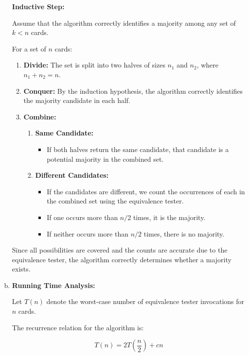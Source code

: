 \documentclass[10pt,letter,notitlepage]{article}
\begin{document}
\begin{Answer}
\begin{enumerate}[(a)]
    \textbf{Inductive Step:}

    Assume that the algorithm correctly identifies a majority among any set of $k < n$ cards.

    For a set of $n$ cards:

    \begin{enumerate}
        \item \textbf{Divide:} The set is split into two halves of sizes $n_1$ and $n_2$, where $n_1 + n_2 = n$.
        \item \textbf{Conquer:} By the induction hypothesis, the algorithm correctly identifies the majority candidate in each half.
        
        \item \textbf{Combine:}
        \begin{enumerate}
            \item \textbf{Same Candidate:}
            \begin{itemize}
                \item If both halves return the same candidate, that candidate is a potential majority in the combined set.
            \end{itemize}
            \item \textbf{Different Candidates:}
            \begin{itemize}
                \item If the candidates are different, we count the occurrences of each in the combined set using the equivalence tester.
                \item If one occurs more than $n/2$ times, it is the majority.
                \item If neither occurs more than $n/2$ times, there is no majority.
            \end{itemize}
        \end{enumerate}
    \end{enumerate}

    Since all possibilities are covered and the counts are accurate due to the equivalence tester, the algorithm correctly determines whether a majority exists.

    \item \textbf{Running Time Analysis:}

    Let $T(n)$ denote the worst-case number of equivalence tester invocations for $n$ cards.

    The recurrence relation for the algorithm is:

    \[
    T(n) = 2T\left(\frac{n}{2}\right) + cn
    \]


\end{enumerate}
\end{Answer}
\end{document}
